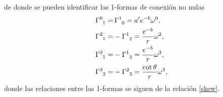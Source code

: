 de donde se pueden identificar las 1-formas de conexión no nulas
\begin{subequations}
    \begin{align}
        \tensor{\Gamma}{^0_1} =& \,\tensor{\Gamma}{^1_0} = a^{\prime} e^{-b} \omega^0, \label{1fa} \\
        \tensor{\Gamma}{^2_1} =& -\tensor{\Gamma}{^1_2} = \frac{e^{-b}}{r}\omega^2, \label{1fb} \\
        \tensor{\Gamma}{^3_1} =& -\tensor{\Gamma}{^1_3} = \frac{e^{-b}}{r}\omega^3, \label{1fc} \\
        \tensor{\Gamma}{^3_2} =& -\tensor{\Gamma}{^2_3} = \frac{\cot{\theta}}{r} \omega^3, \label{1fd}
    \end{align}
\end{subequations}
donde las relaciones entre las 1-formas se siguen de la relación \eqref{skew}.

